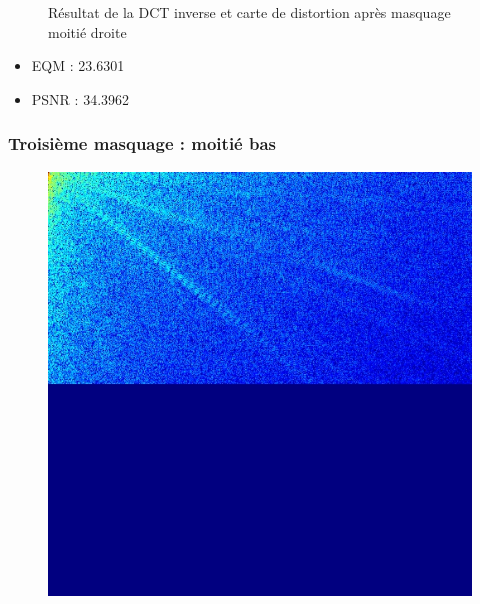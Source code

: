 \documentclass[12pt]{report}
\begin{document}
\begin{figure}[H]
\begin{center}
\caption{Résultat de la DCT inverse et carte de distortion après masquage moitié droite}
\end{center}
\end{figure}

\begin{itemize}
\item EQM : 23.6301
\item PSNR : 34.3962
\end{itemize}

\subsubsection{Troisième masquage : moitié bas}

\begin{figure}[H]
\begin{center}
\includegraphics[scale=0.25]{../ImageRes/dct_masked2_0.jpg} 

\end{center}
\end{figure}
\end{document}

